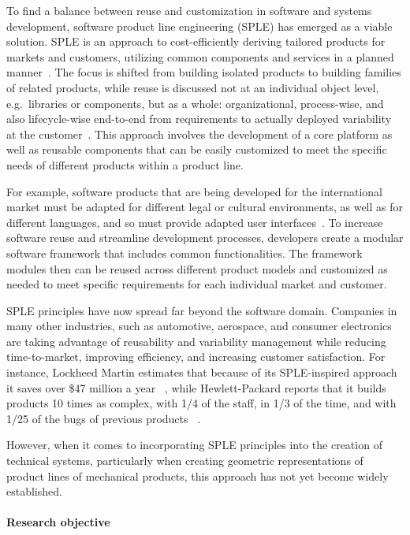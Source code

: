 \documentclass[sigconf,review]{acmart}
\begin{document}
To find a balance between reuse and customization in software and systems development, software product line engineering (SPLE) has emerged as a viable solution. 
SPLE is an approach to cost-efficiently deriving tailored products for markets and customers, utilizing common components and services in a planned manner~\cite{Runeson_2012}.
The focus is shifted from building isolated products to building families of related products, while reuse is discussed not at an individual object level, e.g.~libraries or components, but as a whole: organizational, process-wise, and also lifecycle-wise end-to-end from requirements to actually deployed variability at the customer~\cite{Schwanninger_2009}. 
This approach involves the development of a core platform as well as reusable components that can be easily customized to meet the specific needs of different products within a product line. 

For example, software products that are being developed for the international market must be adapted for different legal or cultural environments, as well as for different languages, and so must provide adapted user interfaces~\cite{Beuche_2007}. 
To increase software reuse and streamline development processes, developers create a modular software framework that includes common functionalities. 
The framework modules then can be reused across different product models and customized as needed to meet specific requirements for each individual market and customer.

SPLE principles have now spread far beyond the software domain. Companies in many other industries, such as automotive, aerospace, and consumer electronics are taking advantage of reusability and variability management while reducing time-to-market, improving efficiency, and increasing customer satisfaction. 
For instance, Lockheed Martin estimates that because of its SPLE-inspired approach it saves over \$47 million a year ~\cite{Gregg_2015}, while Hewlett-Packard reports that it builds products 10 times as complex, with 1/4 of the staff, in 1/3 of the time, and with 1/25 of the bugs of previous products ~\cite{Mebane_2007}.

However, when it comes to incorporating SPLE principles into the creation of technical systems, particularly when creating geometric representations of product lines of mechanical products, this approach has not yet become widely established. 

\paragraph{Research objective}
\end{document}
